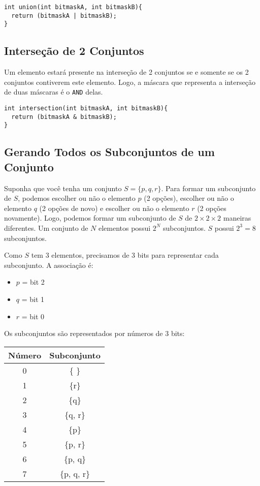 \documentclass{article}
\begin{document}
\begin{verbatim}
int union(int bitmaskA, int bitmaskB){
  return (bitmaskA | bitmaskB);
}
\end{verbatim}

\subsection{Interseção de 2 Conjuntos}
Um elemento estará presente na interseção de 2 conjuntos se e somente se os 2 conjuntos contiverem este elemento. Logo, a máscara que representa a interseção de duas máscaras é o \texttt{AND} delas.

\begin{verbatim}
int intersection(int bitmaskA, int bitmaskB){
  return (bitmaskA & bitmaskB);
}
\end{verbatim}

\subsection{Gerando Todos os Subconjuntos de um Conjunto}
Suponha que você tenha um conjunto \(S = \{p, q, r\}\). Para formar um subconjunto de \(S\), podemos escolher ou não o elemento \(p\) (2 opções), escolher ou não o elemento \(q\) (2 opções de novo) e escolher ou não o elemento \(r\) (2 opções novamente). Logo, podemos formar um subconjunto de \(S\) de \(2 \times 2 \times 2\) maneiras diferentes. Um conjunto de \(N\) elementos possui \(2^N\) subconjuntos. \(S\) possui \(2^3 = 8\) subconjuntos.

Como \(S\) tem 3 elementos, precisamos de 3 bits para representar cada subconjunto. A associação é:

\begin{itemize}
    \item \(p\) = bit 2
    \item \(q\) = bit 1
    \item \(r\) = bit 0
\end{itemize}

Os subconjuntos são representados por números de 3 bits:

\begin{tabular}{|c|c|}
\hline
Número & Subconjunto \\
\hline
0 & \{ \} \\
1 & \{r\} \\
2 & \{q\} \\
3 & \{q, r\} \\
4 & \{p\} \\
5 & \{p, r\} \\
6 & \{p, q\} \\
7 & \{p, q, r\} \\
\hline
\end{tabular}
\end{document}

